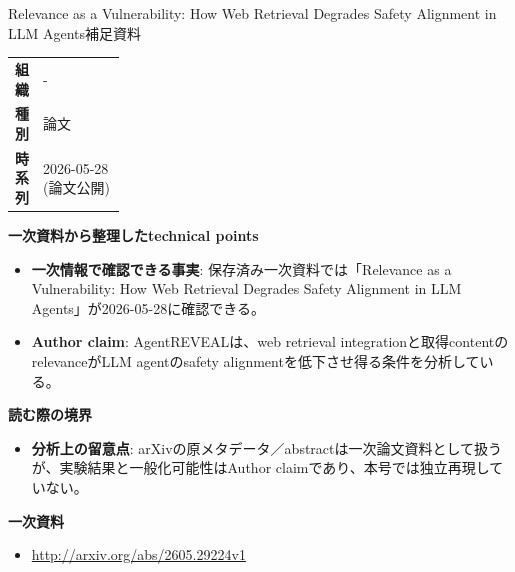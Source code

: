 \begin{technicalnote}{Relevance as a Vulnerability: How Web Retrieval Degrades Safety Alignment in LLM Agents}{補足資料}
\begingroup
\begin{tabularx}{\linewidth}{@{}>{\bfseries}p{0.22\linewidth}X@{}}
組織 & - \\
種別 & 論文 \\
時系列 & 2026-05-28 (論文公開) \\
\end{tabularx}
\smallskip
{\bfseries 一次資料から整理したtechnical points}
\begin{itemize}[leftmargin=1.5em,itemsep=0.35em]
\item \textbf{一次情報で確認できる事実}: 保存済み一次資料では「Relevance as a Vulnerability: How Web Retrieval Degrades Safety Alignment in LLM Agents」が2026-05-28に確認できる。
\end{itemize}
\begin{minipage}{\linewidth}
\begin{itemize}[leftmargin=1.5em,itemsep=0.35em]
\item \textbf{Author claim}: AgentREVEALは、web retrieval integrationと取得contentのrelevanceがLLM agentのsafety alignmentを低下させ得る条件を分析している。
\end{itemize}
{\bfseries 読む際の境界}
\begin{itemize}[leftmargin=1.5em,itemsep=0.35em]
\item \textbf{分析上の留意点}: arXivの原メタデータ／abstractは一次論文資料として扱うが、実験結果と一般化可能性はAuthor claimであり、本号では独立再現していない。
\end{itemize}
\begin{samepage}
{\bfseries 一次資料}
\begingroup\sloppy
\begin{itemize}[leftmargin=1.5em,itemsep=0.25em]
\item {\scriptsize\url{http://arxiv.org/abs/2605.29224v1}}
\end{itemize}
\endgroup
\end{samepage}
\end{minipage}
\endgroup
\end{technicalnote}
\medskip

